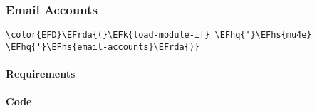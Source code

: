 \documentclass[a4wide,10pt]{article}
\newcommand{\EFk}[1]{\textcolor{EFk}{#1}} %
\newcommand{\EFhq}[1]{\textcolor{EFhq}{#1}} %
\newcommand{\EFhs}[1]{\textcolor{EFhs}{#1}} %
\newcommand{\EFrda}[1]{\textcolor{EFrda}{#1}} %
\begin{document}
\subsubsection{Email Accounts}
\label{sec:orged6797b}
\begin{Code}
\begin{Verbatim}
\color{EFD}\EFrda{(}\EFk{load-module-if} \EFhq{'}\EFhs{mu4e} \EFhq{'}\EFhs{email-accounts}\EFrda{)}
\end{Verbatim}
\end{Code}
\paragraph{Requirements}
\label{sec:orgc985881}
\paragraph{Code}
\label{sec:org8b0102b}
\end{document}
